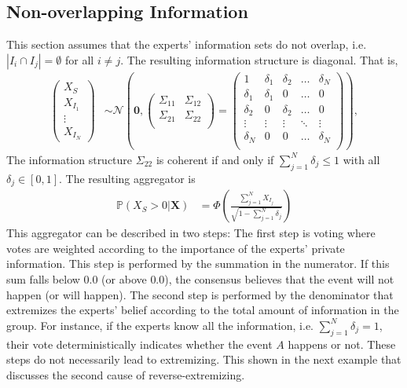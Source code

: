 \documentclass[11pt]{article}
\renewcommand{\P}{\mathbb{P}}
\theoremstyle{definition}
\theoremstyle{definition}
\begin{document}
\subsection{Non-overlapping Information}
\label{nonoverlap}
This section assumes that the experts' information sets do not overlap, i.e.   $|I_{i} \cap I_{j}| = \emptyset$ for all $i \neq j$. The resulting information structure is diagonal.  That is,
\begin{align*}
\left(\begin{matrix} X_{S} \\ X_{I_1}\\ \vdots \\ X_{I_N} \end{matrix}\right) &\sim \mathcal{N}\left( 
 \boldsymbol{0}, \left(\begin{matrix} 
\Sigma_{11} & \Sigma_{12}\\
\Sigma_{21} & \Sigma_{22}\\
 \end{matrix}\right) 
 =
 \left(\begin{array}{c|cccc}
1 & \delta_1 & \delta_2 & \dots & \delta_N  \\ \hline
\delta_1 & \delta_1 &0 & \dots & 0   \\ 
\delta_2 & 0 & \delta_2 & \dots & 0  \\ 
\vdots & \vdots & \vdots & \ddots & \vdots  \\ 
\delta_N & 0 & 0 & \dots & \delta_N\\ 
 \end{array}\right)\right),
\end{align*}
The information structure $\Sigma_{22}$  is coherent if and only if $\sum_{j=1}^N \delta_j \leq 1$ with all $\delta_j \in [0,1]$. The resulting aggregator is 
\begin{align}
\P\left(X_{S} > 0 | \boldsymbol{X}\right) &= \Phi\left( \frac{\sum_{j=1}^N X_{I_j}}{\sqrt{1 - \sum_{j=1}^N \delta_j}}\right) \label{VotingAggre}
\end{align}
This aggregator can be described in two steps: The first step is voting where votes are weighted according to the importance of the experts' private information. This step is performed by the summation in the numerator. If this sum falls below $0.0$ (or above $0.0$), the consensus believes that the event will not happen (or will happen). The second step is performed by the denominator that extremizes the experts' belief according to the total amount of information in the group. For instance, if the experts know all the information, i.e. $\sum_{j=1}^N \delta_j = 1$, their vote deterministically indicates whether the event $A$ happens or not. These steps do not necessarily lead to extremizing. This shown in the next example that discusses the second cause of reverse-extremizing.
\end{document}
